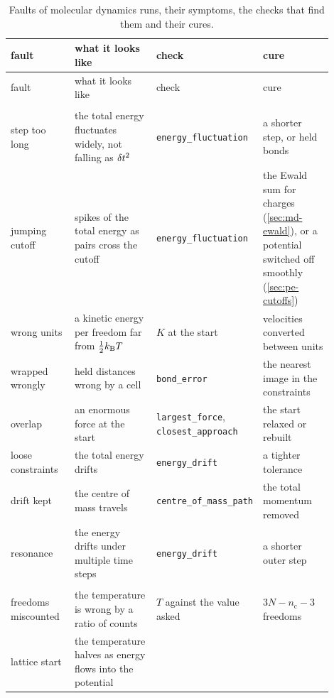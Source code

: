 \begingroup
\small
\begin{longtable}{@{}>{\raggedright\arraybackslash}p{0.20\linewidth}
   >{\raggedright\arraybackslash}p{0.26\linewidth}
   >{\raggedright\arraybackslash}p{0.22\linewidth}
   >{\raggedright\arraybackslash}p{0.22\linewidth}@{}}
\caption{Faults of molecular dynamics runs, their symptoms, the checks
that find them and their cures.}
\label{tab:app-gallery}\\
\toprule
fault & what it looks like & check & cure\\
\midrule
\endfirsthead
\toprule
fault & what it looks like & check & cure\\
\midrule
\endhead
\bottomrule
\endfoot
\multicolumn{4}{@{}l}{\textit{Integrating and constraining
(\cref{sec:cs-trajectory})}}\\
step too long & the total energy fluctuates widely, not falling as
$\delta t^2$ & \texttt{energy\_\allowbreak fluctuation} & a shorter step, or held bonds\\
jumping cutoff & spikes of the total energy as pairs cross the cutoff &
\texttt{energy\_\allowbreak fluctuation} & the Ewald sum for charges
(\cref{sec:md-ewald}), or a potential switched off smoothly
(\cref{sec:pe-cutoffs})\\
wrong units & a kinetic energy per freedom far from $\frac12k_{\mathrm{B}} T$ & $K$ at
the start & velocities converted between units\\
wrapped wrongly & held distances wrong by a cell & \texttt{bond\_error} &
the nearest image in the constraints\\
overlap & an enormous force at the start & \texttt{largest\_\allowbreak force},
\texttt{closest\_\allowbreak approach} & the start relaxed or rebuilt\\
loose constraints & the total energy drifts & \texttt{energy\_\allowbreak drift} & a
tighter tolerance\\
drift kept & the centre of mass travels & \texttt{centre\_\allowbreak of\_\allowbreak mass\_\allowbreak path} &
the total momentum removed\\
resonance & the energy drifts under multiple time steps &
\texttt{energy\_\allowbreak drift} & a shorter outer step\\
\multicolumn{4}{@{}l}{\textit{Ensembles (\cref{sec:sm-trajectory})}}\\
freedoms miscounted & the temperature is wrong by a ratio of counts & $T$
against the value asked & $3N - n_{\mathrm c} - 3$ freedoms\\
lattice start & the temperature halves as energy flows into the potential &

\end{longtable}
